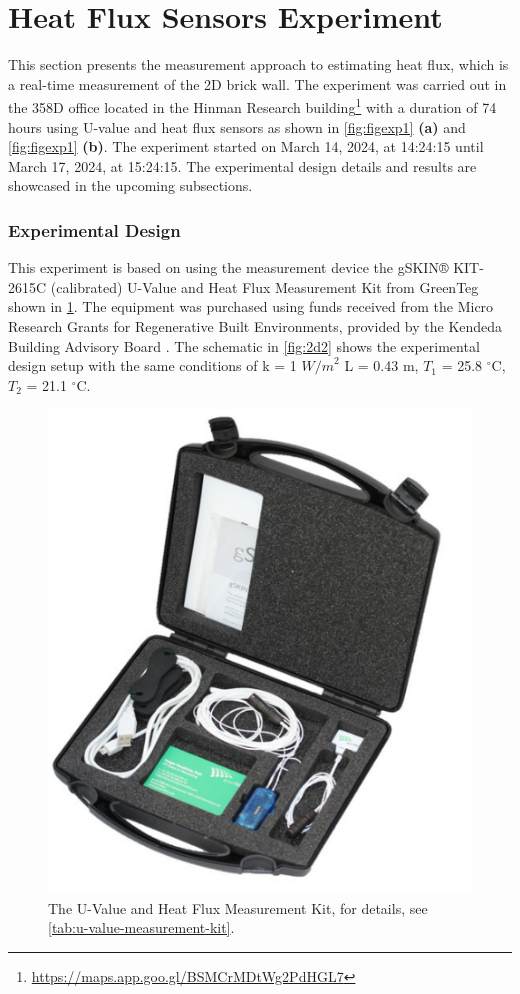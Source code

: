 \section{Heat Flux Sensors Experiment}


This section presents the measurement approach to estimating heat flux, which is a real-time measurement of the 2D brick wall. The experiment was carried out in the 358D office located in the Hinman Research building\footnote{\url{https://maps.app.goo.gl/BSMCrMDtWg2PdHGL7}} with a duration of 74 hours using \gls{U}-value and heat flux sensors as shown in \ref{fig:figexp1} \textbf{(a)} and \ref{fig:figexp1} \textbf{(b)}. The experiment started on March 14, 2024, at 14:24:15 until March 17, 2024, at 15:24:15. 
The experimental design details and results are showcased in the upcoming subsections.





 
\subsubsection{Experimental Design}
 This experiment is based on using the measurement device the gSKIN® KIT-2615C (calibrated) U-Value and Heat Flux Measurement Kit from GreenTeg  \cite{greenteg} shown in \ref{fig:toolkit}. The equipment was purchased using funds received from the Micro Research Grants for Regenerative Built Environments, provided by the Kendeda Building Advisory Board \cite{kendeda}.
 The schematic in \cref{fig:2d2} shows the experimental design setup with the same conditions of k  = 1 ${W/m}^2$ 
L = 0.43 m,
$T_1$ = 25.8 $^\circ \text{C}$, 
$T_2$  = 21.1  $^\circ \text{C}$.




\begin{figure}[tbh]
     \centering
    \includegraphics[width=0.5\linewidth]{Figures/greenteg.png}
     \caption[U-value measurement Kit]{The U-Value and Heat Flux Measurement Kit, for details, see \cref{tab:u-value-measurement-kit}.}
   \label{fig:toolkit}
 \end{figure}







